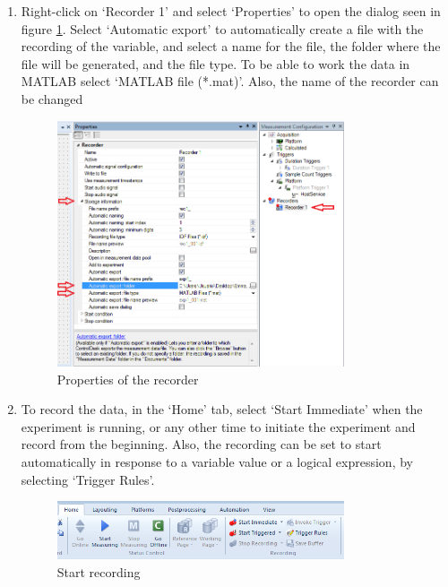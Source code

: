 \begin{enumerate}
    \item Right-click on ‘Recorder 1’ and select ‘Properties’ to open the dialog seen in figure \ref{fig31}. Select ‘Automatic export’ to automatically create a file with the recording of the variable, and select a name for the file, the folder where the file will be generated, and the file type. To be able to work the data in MATLAB select ‘MATLAB file (*.mat)’. Also, the name of the recorder can be changed
    \begin{figure}[H]
        \centering
        \includegraphics[width=0.8\textwidth]{Images/Ball and Bean/ControlDesk/CD8.png}
        \caption{Properties of the recorder}
        \label{fig31}
    \end{figure}

    \item To record the data, in the ‘Home’ tab, select ‘Start Immediate’ when the experiment is running, or any other time to initiate the experiment and record from the beginning. Also, the recording can be set to start automatically in response to a variable value or a logical expression, by selecting ‘Trigger Rules’.
    \begin{figure}[H]
        \centering
        \includegraphics[width=0.8\textwidth]{Images/Ball and Bean/ControlDesk/CD9.png}
        \caption{Start recording}
        \label{fig32}
    \end{figure}
\end{enumerate}

